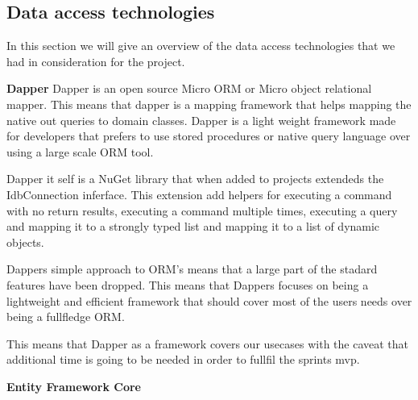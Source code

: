 \subsection{Data access technologies}
In this section we will give an overview of the data access technologies that we had in consideration for the project.


\textbf{Dapper}
Dapper is an open source Micro ORM or Micro object relational mapper. This means that dapper is a mapping framework that helps mapping the native out queries to domain classes. Dapper is a light weight framework made for developers that prefers to use stored procedures or native query language over using a large scale ORM tool. 

Dapper it self is a NuGet library that when added to projects extendeds the IdbConnection inferface. This extension add helpers for executing a command with no return results, executing a command multiple times, executing a query and mapping it to a strongly typed list and mapping it to a list of dynamic objects. \cite{Dapper_Git}

Dappers simple approach to ORM's means that a large part of the stadard features have been dropped. This means that Dappers focuses on being a lightweight and efficient framework that should cover most of the users needs over being a fullfledge ORM.\cite{Dapper_Git} 

This means that Dapper as a framework covers our usecases with the caveat that additional time is going to be needed in order to fullfil the sprints mvp. 

\textbf{Entity Framework Core}



